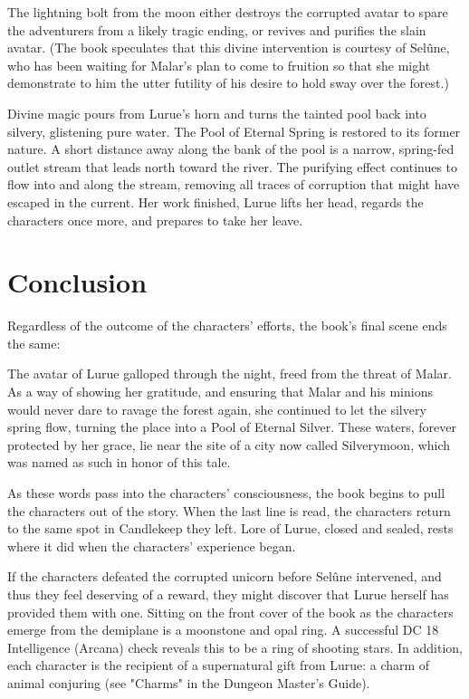\documentclass[10pt,a4paper,twoside,bg=print,twocolumn,openany,nodeprecatedcode]{dndbook}
\begin{document}
The lightning bolt from the moon either destroys the corrupted avatar to spare the adventurers from a likely tragic ending, or revives and purifies the slain avatar. (The book speculates that this divine intervention is courtesy of Selûne, who has been waiting for Malar's plan to come to fruition so that she might demonstrate to him the utter futility of his desire to hold sway over the forest.)

Divine magic pours from Lurue's horn and turns the tainted pool back into silvery, glistening pure water. The Pool of Eternal Spring is restored to its former nature. A short distance away along the bank of the pool is a narrow, spring-fed outlet stream that leads north toward the river. The purifying effect continues to flow into and along the stream, removing all traces of corruption that might have escaped in the current. Her work finished, Lurue lifts her head, regards the characters once more, and prepares to take her leave.

\section{Conclusion}
Regardless of the outcome of the characters' efforts, the book's final scene ends the same:

\begin{DndReadAloud}{}
The avatar of Lurue galloped through the night, freed from the threat of Malar. As a way of showing her gratitude, and ensuring that Malar and his minions would never dare to ravage the forest again, she continued to let the silvery spring flow, turning the place into a Pool of Eternal Silver. These waters, forever protected by her grace, lie near the site of a city now called Silverymoon, which was named as such in honor of this tale.

\end{DndReadAloud}

As these words pass into the characters' consciousness, the book begins to pull the characters out of the story. When the last line is read, the characters return to the same spot in Candlekeep they left. Lore of Lurue, closed and sealed, rests where it did when the characters' experience began.

If the characters defeated the corrupted unicorn before Selûne intervened, and thus they feel deserving of a reward, they might discover that Lurue herself has provided them with one. Sitting on the front cover of the book as the characters emerge from the demiplane is a moonstone and opal ring. A successful DC 18 Intelligence (Arcana) check reveals this to be a ring of shooting stars. In addition, each character is the recipient of a supernatural gift from Lurue: a charm of animal conjuring (see "Charms" in the Dungeon Master's Guide).
\end{document}
